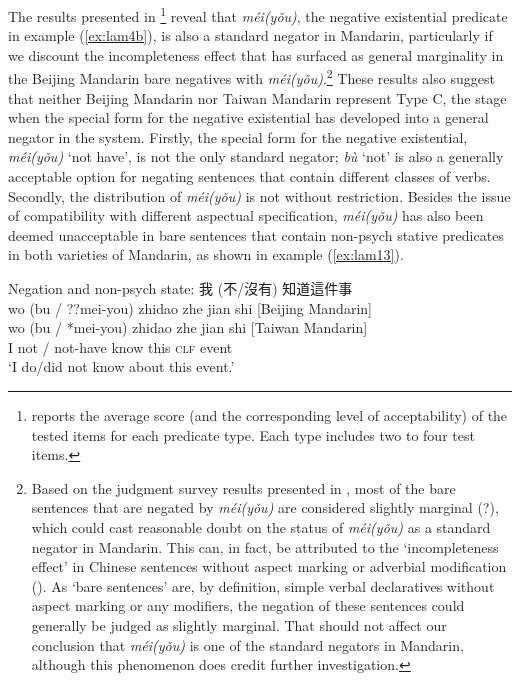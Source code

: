 \documentclass[output=paper,colorlinks,citecolor=brown,chinesefont]{langscibook}
\begin{document}
\largerpage[-1]
The results presented in \footnote{ reports the average score (and the corresponding level of acceptability) of the tested items for each predicate type. Each type includes two to four test items.} reveal that \textit{méi(yǒu)}, the negative existential predicate in example (\ref{ex:lam4b}), is also a standard negator in Mandarin, particularly if we discount the incompleteness effect that has surfaced as general marginality in the Beijing Mandarin bare negatives with \textit{méi(yǒu)}.\footnote{Based on the judgment survey results presented in , most of the bare sentences that are negated by \textit{méi(yǒu)} are considered slightly marginal (?), which could cast reasonable doubt on the status of \textit{méi(yǒu)} as a standard negator in Mandarin. This can, in fact, be attributed to the `incompleteness effect' in Chinese sentences without aspect marking or adverbial modification (\citealt{Tsai2008}).
As `bare sentences' are, by definition, simple verbal declaratives without aspect marking or any modifiers, the negation of these sentences could generally be judged as slightly marginal. That should not affect our conclusion that \textit{méi(yǒu)} is one of the standard negators in Mandarin, although this phenomenon does credit further investigation.} 
These results also suggest that neither Beijing Mandarin nor Taiwan Mandarin represent Type C, the stage when the special form for the negative existential has developed into a general negator in the system. Firstly, the special form for the negative existential, \textit{méi(yǒu)} `not have', is not the only standard negator; \textit{bù} `not' is also a generally acceptable option for negating sentences that contain different classes of verbs. Secondly, the distribution of \textit{méi(yǒu)} is not without restriction. Besides the issue of compatibility with different aspectual specification, \textit{méi(yǒu)} has also been deemed unacceptable in bare sentences that contain non-psych stative predicates in both varieties of Mandarin, as shown in example (\ref{ex:lam13}). 



\let\eachwordtwo=\itshape
\ea Negation and non-psych state: {\cn 我 (不/沒有) 知道這件事} \label{ex:lam13}\\
  \glll wo {(bu / ??mei-you)} zhidao zhe jian shi \textup{[Beijing Mandarin]}\\
  {wo} {(bu / *mei-you)} {zhidao} {zhe} {jian} {shi} \textup{[Taiwan Mandarin]}\\
  I {not / not-have} know this \textsc{clf} event\\
  \glt `I do/did not know about this event.' 
\z 
\end{document}
